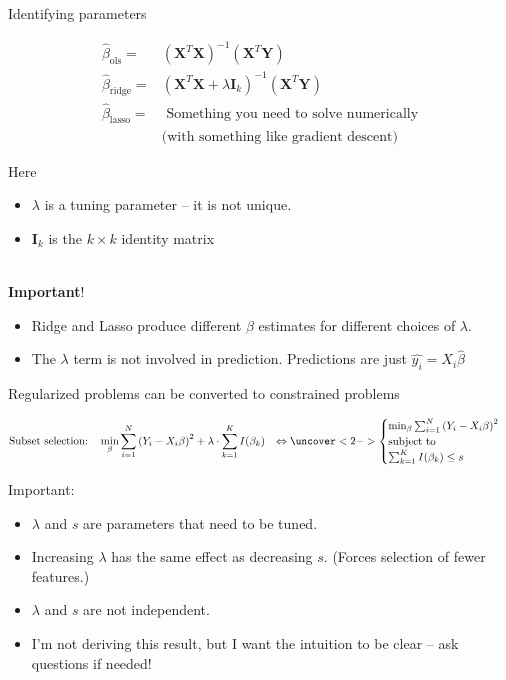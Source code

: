 \documentclass[mathserif, aspectratio=169]{beamer}
\begin{document}
\begin{frame}{Identifying parameters}

\begin{align*}
\hat{\beta}_\text{ols} = & \left(\mathbf{X}^T\mathbf{X}\right)^{-1} \left(\mathbf{X}^T\mathbf{Y}\right)\\
\hat{\beta}_\text{ridge} =& \left(\mathbf{X}^T\mathbf{X} + \lambda\mathbf{I}_k\right)^{-1} \left(\mathbf{X}^T\mathbf{Y}\right)\\
\hat{\beta}_\text{lasso}  =& \text{ Something you need to solve numerically} \\
&\text{(with something like gradient descent)}
\end{align*}

Here 
\begin{itemize}
\item $\lambda$ is a tuning parameter -- it is not unique.  
\item $\mathbf{I}_k$ is the $k\times k$ identity matrix\\~\\
\end{itemize}
\vspace{-1mm}
\pause
\textbf{Important}! 
\begin{itemize}
	\item Ridge and Lasso produce different $\beta$ estimates for different choices of $\lambda$.
	\item  The $\lambda$ term is not involved in prediction.  Predictions are just $\hat{y_i} =  X_i \hat{\beta}$
\end{itemize}
\end{frame}

\begin{frame}{Regularized problems can be converted to constrained problems}

\begin{align*}
\text{Subset selection:} \quad &\min_\beta \sum_{i=1}^N \left(Y_i - X_i \beta \right)^2+\lambda \cdot \sum_{k=1}^K I(\beta_k)
&\Leftrightarrow
\uncover<2->{\begin{cases}
\min_\beta \sum_{i=1}^N \left(Y_i - X_i \beta \right)^2\\
\text{subject to}\\
\sum_{k=1}^K I(\beta_k) \le s
\end{cases}}
\end{align*}

\pause
Important: 
\begin{itemize}
\item $\lambda$ and $s$ are parameters that need to be tuned. 
\item Increasing $\lambda$ has the same effect as decreasing $s$.  (Forces selection of fewer features.)
\item $\lambda$ and $s$ are not independent.  
\item I'm not deriving this result, but I want the intuition to be clear -- ask questions if needed!
\end{itemize}

\end{frame}
\end{document}
